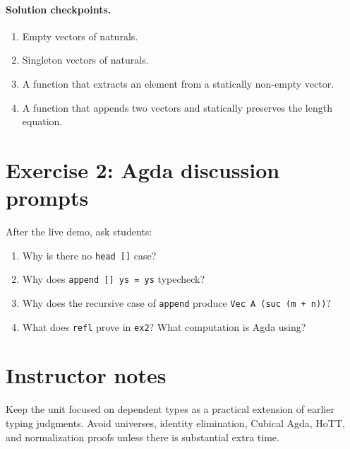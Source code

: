 \documentclass[11pt]{article}
\begin{document}
\paragraph{Solution checkpoints.}
\begin{enumerate}[nosep]
  \item Empty vectors of naturals.
  \item Singleton vectors of naturals.
  \item A function that extracts an element from a statically non-empty vector.
  \item A function that appends two vectors and statically preserves the length equation.
\end{enumerate}

\section*{Exercise 2: Agda discussion prompts}
After the live demo, ask students:
\begin{enumerate}
  \item Why is there no \texttt{head []} case?
  \item Why does \texttt{append [] ys = ys} typecheck?
  \item Why does the recursive case of \texttt{append} produce \texttt{Vec A (suc (m + n))}?
  \item What does \texttt{refl} prove in \texttt{ex2}? What computation is Agda using?
\end{enumerate}

\section*{Instructor notes}
Keep the unit focused on dependent types as a practical extension of earlier typing judgments. Avoid universes, identity elimination, Cubical Agda, HoTT, and normalization proofs unless there is substantial extra time.
\end{document}
